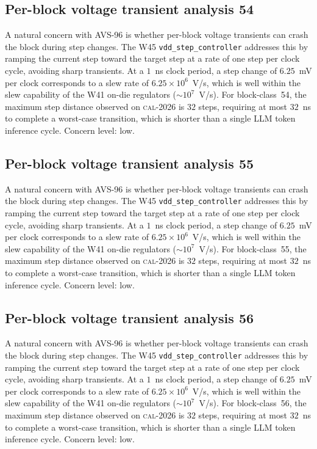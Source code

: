 \subsection{Per-block voltage transient analysis 54}

A natural concern with AVS-96 is whether per-block voltage transients
can crash the block during step changes. The W45 \texttt{vdd\_step\_controller} addresses this by ramping the current
step toward the target step at a rate of one step per clock cycle,
avoiding sharp transients. At a $1$~ns clock period, a step change of
$6.25$~mV per clock corresponds to a slew rate of $6.25\times 10^6$~V/s,
which is well within the slew capability of the W41 on-die regulators
($\sim 10^7$~V/s). For block-class~54, the maximum step distance
observed on \textsc{cal-2026} is $32$ steps, requiring at most $32$~ns
to complete a worst-case transition, which is shorter than a single
LLM token inference cycle. Concern level: low.


\subsection{Per-block voltage transient analysis 55}

A natural concern with AVS-96 is whether per-block voltage transients
can crash the block during step changes. The W45 \texttt{vdd\_step\_controller} addresses this by ramping the current
step toward the target step at a rate of one step per clock cycle,
avoiding sharp transients. At a $1$~ns clock period, a step change of
$6.25$~mV per clock corresponds to a slew rate of $6.25\times 10^6$~V/s,
which is well within the slew capability of the W41 on-die regulators
($\sim 10^7$~V/s). For block-class~55, the maximum step distance
observed on \textsc{cal-2026} is $32$ steps, requiring at most $32$~ns
to complete a worst-case transition, which is shorter than a single
LLM token inference cycle. Concern level: low.


\subsection{Per-block voltage transient analysis 56}

A natural concern with AVS-96 is whether per-block voltage transients
can crash the block during step changes. The W45 \texttt{vdd\_step\_controller} addresses this by ramping the current
step toward the target step at a rate of one step per clock cycle,
avoiding sharp transients. At a $1$~ns clock period, a step change of
$6.25$~mV per clock corresponds to a slew rate of $6.25\times 10^6$~V/s,
which is well within the slew capability of the W41 on-die regulators
($\sim 10^7$~V/s). For block-class~56, the maximum step distance
observed on \textsc{cal-2026} is $32$ steps, requiring at most $32$~ns
to complete a worst-case transition, which is shorter than a single
LLM token inference cycle. Concern level: low.



